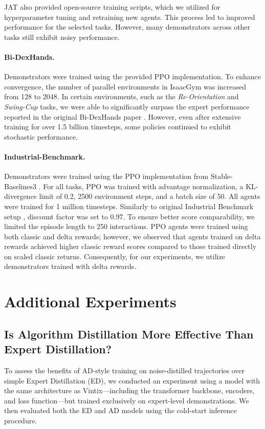 \documentclass{article}
\theoremstyle{plain}
\theoremstyle{definition}
\theoremstyle{remark}
\begin{document}
JAT \cite{gallouédec2024jacktradesmastersome} also provided open-source training scripts, which we utilized for hyperparameter tuning and retraining new agents. This process led to improved performance for the selected tasks. However, many demonstrators across other tasks still exhibit noisy performance.

\paragraph{Bi-DexHands.} Demonstrators were trained using the provided PPO \cite{schulman2017proximalpolicyoptimizationalgorithms} implementation. To enhance convergence, the number of parallel environments in IsaacGym \cite{liang2018gpuacceleratedroboticsimulationdistributed} was increased from 128 to 2048. In certain environments, such as the \textit{Re-Orientation} and \textit{Swing-Cup} tasks, we were able to significantly surpass the expert performance reported in the original Bi-DexHands paper \cite{chen2022humanlevelbimanualdexterousmanipulation}. However, even after extensive training for over 1.5 billion timesteps, some policies continued to exhibit stochastic performance.

\paragraph{Industrial-Benchmark.} Demonstrators were trained using the PPO implementation from Stable-Baselines3 \cite{stable-baselines3}. For all tasks, PPO was trained with advantage normalization, a KL-divergence limit of 0.2, 2500 environment steps, and a batch size of 50. All agents were trained for 1 million timesteps. Similarly to original Industrial Benchmark setup \cite{Hein_2017}, discount factor was set to 0.97. To ensure better score comparability, we limited the episode length to 250 interactions. PPO agents were trained using both classic and delta rewards; however, we observed that agents trained on delta rewards achieved higher classic reward scores compared to those trained directly on scaled classic returns. Consequently, for our experiments, we utilize demonstrators trained with delta rewards.

\section{Additional Experiments}
\subsection{Is Algorithm Distillation More Effective Than Expert Distillation?}
To assess the benefits of AD-style training on noise-distilled trajectories over simple Expert Distillation (ED), we conducted an experiment using a model with the same architecture as Vintix—including the transformer backbone, encoders, and loss function—but trained exclusively on expert-level demonstrations. We then evaluated both the ED and AD models using the cold-start inference procedure.
\end{document}
